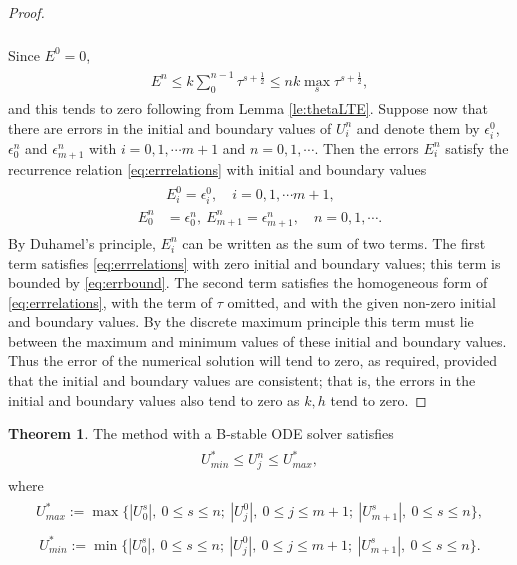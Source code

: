 \documentclass[a4paper,twoside]{ctexart}
\theoremstyle{definition}
\newtheorem{theorem}[definition]{Theorem}
\begin{document}
\begin{proof}
\begin{eqnarray}
\begin{aligned}
	\end{aligned}
	\end{eqnarray}
	Since $E^0 = 0$, 
	\begin{eqnarray}
	\label{eq:errbound}
	\begin{aligned}
	E^{n} 
	\le k \sum_{0}^{n-1}\tau^{s+\frac{1}{2}} \le nk \max_{s} \tau^{s+\frac{1}{2}},
	\end{aligned}
	\end{eqnarray}
	and this tends to zero following from Lemma \ref{le:thetaLTE}. Suppose now that there are errors in the initial and boundary values of $U_i^n$ and denote them by $\epsilon_i^0$, $\epsilon_0^n$ and $\epsilon_{m+1}^n$ with $i = 0,1,\cdots m+1$ and $n = 0,1,\cdots$. Then the errors $E_i^n$  satisfy the
	recurrence relation \eqref{eq:errrelations} with initial and boundary values
	\begin{eqnarray}
	\begin{aligned}
	&E_i^0 = \epsilon_i^0, \quad i = 0,1,\cdots m+1,\\
	E_0^n &= \epsilon_0^n, \ E_{m+1}^n = \epsilon_{m+1}^n, \quad n = 0,1,\cdots.
	\end{aligned}
	\end{eqnarray}
	By Duhamel's principle, $E_i^n$ can be written as the sum of two
	terms. The first term satisfies \eqref{eq:errrelations} with zero initial and boundary
	values; this term is bounded by \eqref{eq:errbound}. The second term satisfies the
	homogeneous form of \eqref{eq:errrelations}, with the term of $\tau$ omitted, and with the given non-zero initial and boundary values. By the discrete maximum principle
	this term must lie between the maximum and minimum values of these
	initial and boundary values. Thus the error of the numerical solution
	will tend to zero, as required, provided that
	the initial and boundary values are consistent; that is, the errors in the
	initial and boundary values also tend to zero as $k,h$ tend to zero.
\end{proof}
\begin{theorem}
	The method with a B-stable ODE solver satisfies 
	\begin{eqnarray}
	\begin{aligned}
	U_{min}^* \le U_j^n \le U_{max}^*,
	\end{aligned}
	\end{eqnarray}
		where
	\begin{eqnarray}
	\begin{aligned}
	U_{max}^* := \max{\{|U_0^s|,\ 0 \le s \le n;\ |U_j^0|,\ 0 \le j \le m+1; \ |U_{m+1}^s|,\ 0 \le s \le n\}},
	\end{aligned}
	\end{eqnarray}
		\begin{eqnarray}
	\begin{aligned}
	U_{min}^* := \min{\{|U_0^s|,\ 0 \le s \le n;\ |U_j^0|,\ 0 \le j \le m+1; \ |U_{m+1}^s|,\ 0 \le s \le n\}}.
	\end{aligned}
	\end{eqnarray}
\end{theorem}
\end{document}
